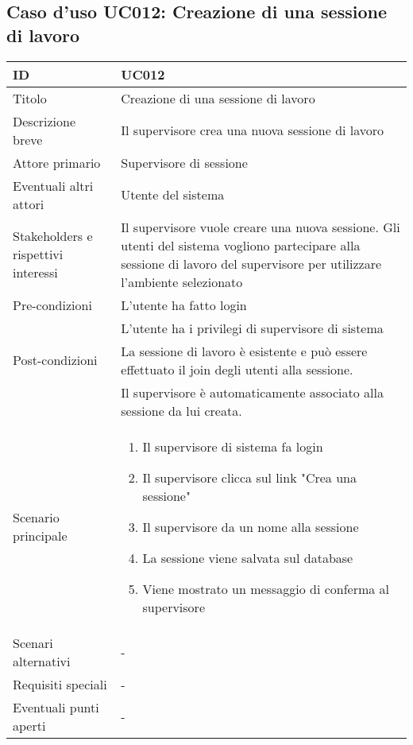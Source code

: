 \documentclass[../../main.tex]{subfiles}
\begin{document}
\subsection{Caso d’uso UC012: Creazione di una sessione di lavoro }
\begin{tabularx}{150mm}{|l|X|}
    \hline
    ID                                  & \textbf{UC012} \\
    \hline
    Titolo                              & Creazione di una sessione di lavoro \\
    \hline
    Descrizione breve                   & Il supervisore crea una nuova sessione di lavoro   \\
    \hline
    Attore primario                     & Supervisore di sessione   \\
    \hline
    Eventuali altri attori              & Utente del sistema   \\
    \hline
    Stakeholders e rispettivi interessi & Il supervisore vuole creare una nuova sessione. Gli utenti del sistema vogliono partecipare alla sessione di lavoro del supervisore per utilizzare l'ambiente selezionato \\
    \hline
    Pre-condizioni                      & L'utente ha fatto login \\ & L'utente ha i privilegi di supervisore di sistema   \\
    \hline
    Post-condizioni                     & La sessione di lavoro è esistente e può essere effettuato il join degli utenti alla sessione.  
    \\ & Il supervisore è automaticamente associato alla sessione da lui creata. \\
    \hline
    Scenario principale                 &
    \begin {enumerate}
\item Il supervisore di sistema fa login
\item Il supervisore clicca sul link "Crea una sessione"
\item Il supervisore da un nome alla sessione
\item La sessione viene salvata sul database
\item Viene mostrato un messaggio di conferma al supervisore
    \end {enumerate}
\\
    \hline
    Scenari alternativi                 & -   \\
    \hline
    Requisiti speciali                  & -   \\
    \hline
    Eventuali punti aperti              & -   \\
    \hline
\end{tabularx}
\vfill\newpage
\end{document}
